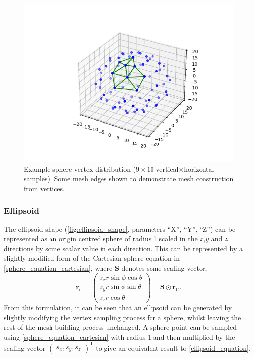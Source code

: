 \begin{figure}
  \begin{center}
    \includegraphics[width=0.8\linewidth]{assets/images/shapes/sphere_vertices}
    \caption{Example sphere vertex distribution ($9\times10$ vertical$\times$horizontal samples). Some mesh edges shown to demonstrate mesh construction from vertices.}
    \label{fig:sphere_vertices}
  \end{center}
\end{figure}


\subsubsection{Ellipsoid}
The ellipsoid shape (\cref{fig:ellipsoid_shape}, parameters ``X'', ``Y'', ``Z'') can be represented as an origin centred sphere of radius 1 scaled in the $x$,$y$ and $z$ directions by some scalar value in each direction. This can be represented by a slightly modified form of the Cartesian sphere equation in \cref{sphere_equation_cartesian}, where $\mathbf{S}$ denotes some scaling vector,
\begin{equation}
\mathbf{r}_\mathrm{e}=\begin{pmatrix}s_x r\sin\phi \cos\theta\\
s_y r\sin\phi \sin\theta\\
s_z r\cos\theta\end{pmatrix}
=\mathbf{S} \odot \mathbf{r}_\mathrm{C}.
\label{ellipsoid_equation}
\end{equation}
From this formulation, it can be seen that an ellipsoid can be generated by slightly modifying the vertex sampling process for a sphere, whilst leaving the rest of the mesh building process unchanged. A sphere point can be sampled using \cref{sphere_equation_cartesian} with radius 1 and then multiplied by the scaling vector $\begin{pmatrix}s_x,s_y,s_z\end{pmatrix}^\mathsf{T}$ to give an equivalent result to \cref{ellipsoid_equation}.

